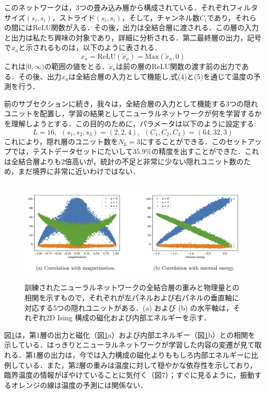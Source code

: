 \documentclass[a4paper,11pt]{jsarticle}
\begin{document}
このネットワークは，3つの畳み込み層から構成されている．それぞれフィルタサイズ$(s_i,s_i)$，ストライド$(s_i,s_i)$，そして，チャンネル数$C_i$であり，それらの間にはReLU関数が入る．その後，出力は全結合層に渡される．この層の入力と出力は私たち興味の対象であり，詳細に分析される．第二最終層の出力，記号で$x_a$と示されるものは，以下のように表される．
\begin{equation}
  x_a = \text{ReLU}(\tilde{x}_a) = \text{Max}(\tilde{x}_a,0)
\end{equation}
これは$[0,\infty)$の範囲の値をとる．$\tilde{x}_a$は前の層のReLU関数の渡す前の出力である．その後、出力$x_a$は全結合層の入力として機能し,式(4)と(5)を通じて温度の予測を行う．\par
前のサブセクションに続き，我々は，全結合層の入力として機能する3つの隠れユニットを配置し，学習の結果としてニューラルネットワークが何を学習するかを理解しようとする．この目的のために，パラメータは以下のように設定する:
\begin{equation}
  L = 16, \ \ (s_1, s_2, s_3) = (2, 2, 4), \ \ (C_1, C_2, C_3) = (64, 32, 3)
\end{equation}
これにより，隠れ層のユニット数を$N_{\text{h}}=3$にすることができる．このセットアップでは，テストデータセットにたいして$35.9\%$の精度を出すことができた．これは全結合層よりも2倍高いが，統計の不足と非常に少ない隠れユニット数のため，まだ境界に非常に近いわけではない．\par
\begin{figure}[ht]
  \begin{center}
    \includegraphics[height=5cm]{image/Figure5.png}
    \caption{訓練されたニューラルネットワークの全結合層の重みと物理量との相関を示すもので，それぞれが左パネルおよび右パネルの垂直軸に対応する5つの隠れユニットがある．(a) および (b) の水平軸は，それぞれ2D Ising 構成の磁化および内部エネルギーを示す．\label{correlation}}
  \end{center}
\end{figure}
図\ref{correlation}は，第1層の出力と磁化（図\ref{correlation}a）および内部エネルギー（図\ref{correlation}b）との相関を示している．はっきりとニューラルネットワークが学習した内容の変遷が見て取れる．第1層の出力は，今では入力構成の磁化よりももしろ内部エネルギーに比例している．また，第2層の重みは温度に対して穏やかな依存性を示しており，臨界温度の情報がぼやけていることに気付く（図7）；すぐに見るように，振動するオレンジの線は温度の予測には関係ない．\par
\end{document}
